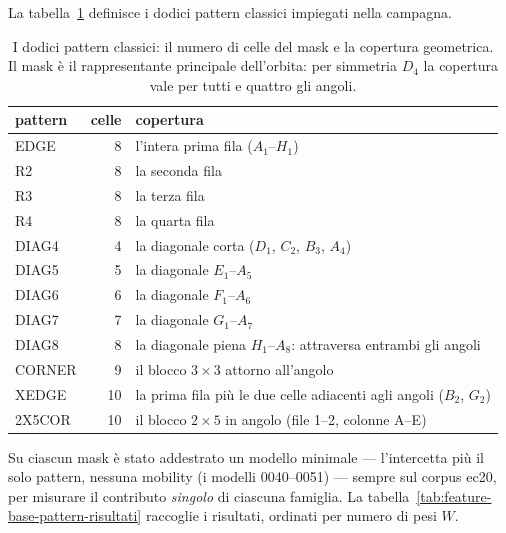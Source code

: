 La tabella~\ref{tab:feature-base-pattern-definizione} definisce i
dodici pattern classici impiegati nella campagna.

\begin{table}[ht]
\centering
\begin{tabular}{lrl}
\toprule
pattern & celle & copertura \\
\midrule
EDGE   & 8  & l'intera prima fila ($A_1$--$H_1$) \\
R2     & 8  & la seconda fila \\
R3     & 8  & la terza fila \\
R4     & 8  & la quarta fila \\
DIAG4  & 4  & la diagonale corta ($D_1$, $C_2$, $B_3$, $A_4$) \\
DIAG5  & 5  & la diagonale $E_1$--$A_5$ \\
DIAG6  & 6  & la diagonale $F_1$--$A_6$ \\
DIAG7  & 7  & la diagonale $G_1$--$A_7$ \\
DIAG8  & 8  & la diagonale piena $H_1$--$A_8$: attraversa entrambi gli angoli \\
CORNER & 9  & il blocco $3\times3$ attorno all'angolo \\
XEDGE  & 10 & la prima fila più le due celle adiacenti agli angoli ($B_2$, $G_2$) \\
2X5COR & 10 & il blocco $2\times5$ in angolo (file 1--2, colonne A--E) \\
\bottomrule
\end{tabular}
\caption{I dodici pattern classici: il numero di celle del mask e la
copertura geometrica. Il mask è il rappresentante principale
dell'orbita: per simmetria $D_4$ la copertura vale per tutti e quattro
gli angoli.}
\label{tab:feature-base-pattern-definizione}
\end{table}

Su ciascun mask è stato addestrato un modello minimale — l'intercetta
più il solo pattern, nessuna mobility (i modelli 0040--0051) — sempre
sul corpus ec20, per misurare il contributo \emph{singolo} di ciascuna
famiglia. La tabella~\ref{tab:feature-base-pattern-risultati}
raccoglie i risultati, ordinati per numero di pesi $W$.

